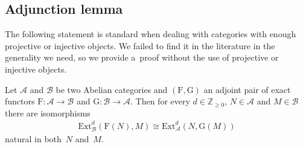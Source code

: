 \subsection{Adjunction lemma}%

The following statement is standard when dealing with categories with enough projective or injective objects.
We failed to f\/ind it in the literature in the generality we need, so we provide a~proof without the use of projective or
injective objects.

\begin{proposition}
\label{adjlem}
Let $\mathcal{A}$ and $\mathcal{B}$ be two Abelian categories and $(\mathrm{F},\mathrm{G})$ an adjoint pair of exact
functors $\mathrm{F}:\mathcal{A}\to \mathcal{B}$ and $\mathrm{G}:\mathcal{B}\to \mathcal{A}$.
Then for every $d\in\mathbb{Z}_{\geq 0}$, $N\in \mathcal{A}$ and $M\in \mathcal{B}$ there are isomorphisms
\begin{gather*}
\mathrm{Ext}^d_{\mathcal{B}}(\mathrm{F}(N),M)\cong \mathrm{Ext}^d_{\mathcal{A}}(N,\mathrm{G}(M))
\end{gather*}
natural in both~$N$ and~$M$.
\end{proposition}


